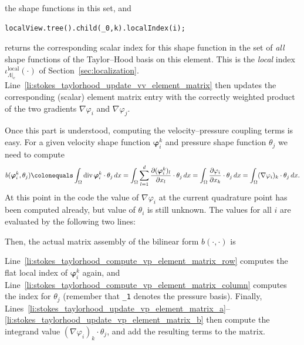 \documentclass[a4paper,10pt,headings=normal,bibliography=totoc]{scrartcl}
\newcommand{\cpp}[1]{\lstinline[basicstyle=\ttfamily]!#1!}
\begin{document}
the shape functions in this set, and
\begin{lstlisting}[style=Example]
localView.tree().child(_0,k).localIndex(i);
\end{lstlisting}
returns the corresponding scalar index for this shape function in the set of \emph{all} shape functions
of the Taylor--Hood basis on this element.  This is the \emph{local} index
$\iota^{\text{local}}_{\Lambda|_e}(\cdot)$ of Section~\ref{sec:localization}.
Line~\ref{li:stokes_taylorhood_update_vv_element_matrix} then updates the corresponding (scalar)
element matrix entry with the correctly weighted product of the two gradients $\nabla \varphi_i$
and $\nabla \varphi_j$.

Once this part is understood, computing the velocity--pressure coupling terms is easy.
For a given velocity shape function $\bm{\varphi}_i^k$ and pressure shape function $\theta_j$ we need
to compute
\begin{equation*}
 b(\bm{\varphi}_i^k,\theta_j)
 \colonequals
 \int_\Omega \operatorname{div} \bm{\varphi}_i^k \cdot \theta_j\,dx
 =
 \int_\Omega \sum_{l=1}^d \frac{\partial (\bm{\varphi}_i^k)_l}{\partial x_l} \cdot \theta_j\,dx
 =
 \int_\Omega \frac{\partial \varphi_i}{\partial x_k} \cdot \theta_j\,dx
 =
 \int_\Omega (\nabla \varphi_i)_k \cdot \theta_j\,dx.
\end{equation*}
At this point in the code the value of $\nabla \varphi_i$ at the current quadrature point
has been computed already, but value of $\theta_i$ is still unknown.
The values for all $i$ are evaluated by the following two lines:
%

%
Then, the actual matrix assembly of the bilinear form $b(\cdot,\cdot)$ is
%

%
Line~\ref{li:stokes_taylorhood_compute_vp_element_matrix_row} computes the
flat local index of $\bm{\varphi}_i^k$ again,
and Line~\ref{li:stokes_taylorhood_compute_vp_element_matrix_column} computes the index for $\theta_j$ (remember that \cpp{_1} denotes
the pressure basis).  Finally, Lines~\ref{li:stokes_taylorhood_update_vp_element_matrix_a}--\ref{li:stokes_taylorhood_update_vp_element_matrix_b}
then compute the integrand value $(\nabla \varphi_i)_k \cdot \theta_j$,
and add the resulting terms to the matrix.







\end{document}
